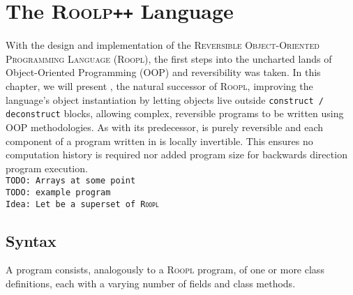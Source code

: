 \chapter{The \textsc{Roolp\texttt{++}} Language}
With the design and implementation of the \textsc{Reversible Object-Oriented Programming Language} (\textsc{Roopl}), the first steps into the uncharted lands of Object-Oriented Programming (OOP) and reversibility was taken. In this chapter, we will present \rooplpp, the natural successor of \textsc{Roopl}, improving the language's object instantiation by letting objects live outside \texttt{construct / deconstruct} blocks, allowing complex, reversible programs to be written using OOP methodologies. As with its predecessor, \rooplpp is purely reversible and each component of a program written in \rooplpp is locally invertible. This ensures no computation history is required nor added program size for backwards direction program execution.\\

\texttt{TODO: Arrays at some point}\\

\texttt{TODO: \rooplpp example program}\\

\texttt{Idea: Let \rooplpp be a superset of \textsc{Roopl}}

\newpage
\section{Syntax}
A \rooplpp program consists, analogously to a \textsc{Roopl} program, of one or more class definitions, each with a varying number of fields and class methods.


